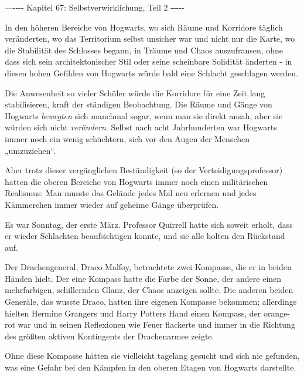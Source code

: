 

\hypertarget{selbstverwirklichung-teil-2}{%

—\/-\/-\/-\/- Kapitel 67: Selbstverwirklichung, Teil 2 -\/-\/-\/-\/-

In den höheren Bereiche von Hogwarts, wo sich Räume und Korridore täglich veränderten, wo das Territorium selbst unsicher war und nicht nur die Karte, wo die Stabilität des Schlosses begann, in Träume und Chaos auszufransen, ohne dass sich sein architektonischer Stil oder seine scheinbare Solidität änderten - in diesen hohen Gefilden von Hogwarts würde bald eine Schlacht geschlagen werden.

Die Anwesenheit so vieler Schüler würde die Korridore für eine Zeit lang stabilisieren, kraft der ständigen Beobachtung. Die Räume und Gänge von Hogwarts \emph{bewegten} sich manchmal sogar, wenn man sie direkt ansah, aber sie würden sich nicht \emph{verändern}. Selbst nach acht Jahrhunderten war Hogwarts immer noch ein wenig schüchtern, sich vor den Augen der Menschen „umzuziehen“.

Aber trotz dieser vergänglichen Beständigkeit (so der Verteidigungsprofessor) hatten die oberen Bereiche von Hogwarts immer noch einen militärischen Realismus: Man musste das Gelände jedes Mal neu erlernen und jedes Kämmerchen immer wieder auf geheime Gänge überprüfen.

Es war Sonntag, der erste März. Professor Quirrell hatte sich soweit erholt, dass er wieder Schlachten beaufsichtigen konnte, und sie alle holten den Rückstand auf.

Der Drachengeneral, Draco Malfoy, betrachtete zwei Kompasse, die er in beiden Händen hielt. Der eine Kompass hatte die Farbe der Sonne, der andere einen mehrfarbigen, schillernden Glanz, der Chaos anzeigen sollte. Die anderen beiden Generäle, das wusste Draco, hatten ihre eigenen Kompasse bekommen; allerdings hielten Hermine Grangers und Harry Potters Hand einen Kompass, der orange-rot war und in seinen Reflexionen wie Feuer flackerte und immer in die Richtung des größten aktiven Kontingents der Drachenarmee zeigte.

Ohne diese Kompasse hätten sie vielleicht tagelang gesucht und sich nie gefunden, was eine Gefahr bei den Kämpfen in den oberen Etagen von Hogwarts darstellte.

}
